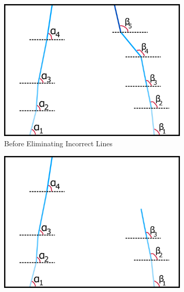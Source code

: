 \documentclass[a4paper,12pt]{article}
\begin{document}
\begin{enumerate}
\begin{figure}[h!]
\setlength{\unitlength}{\textwidth} 

\centering

\begin{subfigure}{.46\textwidth}

\centering

\includegraphics[width=0.44\unitlength]{images/dataP_explained3}

\caption{\label{fig:dataP_explained3} Before Eliminating Incorrect Lines}

\end{subfigure}%
\begin{subfigure}{.46\textwidth}

\centering

\includegraphics[width=0.44\unitlength]{images/dataP_explained4}


\end{subfigure}
\end{figure}
\end{enumerate}
\end{document}
